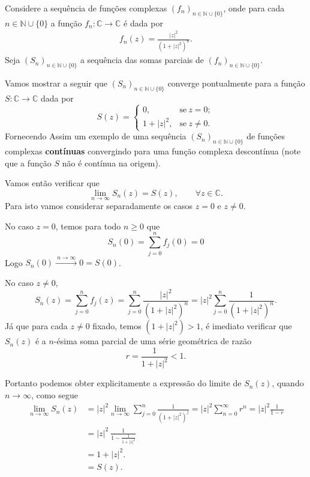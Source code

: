 \begin{exemplo}\label{ex-lim-Somas-desc}
Considere a sequência de funções complexas $(f_n)_{n\in\mathbb{N}\cup\{0\}}$,
onde para cada $n\in\mathbb{N}\cup\{0\}$ a função 
$f_n:\mathbb{C}\to\mathbb{C}$ é dada por 
\begin{align*}
f_n(z) = \frac{|z|^2}{(1+|z|^2)^n}.
\end{align*}
Seja $(S_n)_{n\in\mathbb{N}\cup\{0\}}$ a sequência das somas parciais de $(f_n)_{n\in\mathbb{N}\cup\{0\}}$. 

\medskip 
Vamos mostrar a seguir que $(S_n)_{n\in\mathbb{N}\cup\{0\}}$ converge pontualmente para a função 
$S:\mathbb{C}\to\mathbb{C}$ dada por
\[
S(z) 
=
\begin{cases}
0,&\text{se}\ z=0;\\
1+|z|^2,&\text{se}\ z\neq 0.
\end{cases}
\]
Fornecendo Assim um exemplo de uma sequência 
$(S_n)_{n\in\mathbb{N}\cup\{0\}}$
de funções complexas \textbf{contínuas}
convergindo para uma função complexa descontínua 
(note que a função $S$ não é contínua na origem). 

Vamos então verificar que 
\[
\lim_{n\to\infty} S_n(z) = S(z), \qquad \forall z\in\mathbb{C}.
\]
Para isto vamos considerar separadamente os casos $z=0$ e $z\neq 0$.

No caso $z=0$, temos para todo $n\geqslant 0$ que
\[ 
S_n(0) = \sum_{j=0}^n f_j(0) = 0
\]
Logo $S_n(0)\xrightarrow{\ n\to\infty\ }0=S(0)$.

No caso $z\neq 0$, 
\[ 
S_n(z) 
= \sum_{j=0}^n f_j(z) 
= \sum_{j=0}^n \frac{|z|^2}{(1+|z|^2)^n}
= |z|^2 \sum_{j=0}^n \frac{1}{(1+|z|^2)^n}.
\]
Já  que para cada $z\neq 0$ fixado, temos $(1+|z|^2)>1$, é imediato verificar 
que $S_n(z)$ é a $n$-ésima soma parcial de uma série geométrica de razão 
\[
r = \frac{1}{1+|z|^2}<1.
\]

Portanto podemos obter explicitamente a expressão do limite de $S_n(z)$,
quando $n\to\infty$, como segue
\begin{align*}
\lim_{n\to\infty} S_n(z) 
&=
|z|^2 \lim_{n\to\infty}\sum_{j=0}^n \frac{1}{(1+|z|^2)^j}
=
|z|^2 
\sum_{n=0}^{\infty} r^n
=
|z|^2 \frac{1}{1-r}
\\
&
=
|z|^2 \ \frac{1}{1- \frac{1}{1+|z|^2} }
\\
&=
1+|z|^2.
\\
&=
S(z).
\end{align*}
\end{exemplo}



